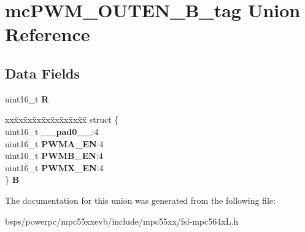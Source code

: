 \hypertarget{unionmcPWM__OUTEN__16B__tag}{}\section{mc\+P\+W\+M\+\_\+\+O\+U\+T\+E\+N\+\_\+B\+\_\+tag Union Reference}
\label{unionmcPWM__OUTEN__16B__tag}
\subsection*{Data Fields}
\begin{DoxyCompactItemize}
\item 
\mbox{\label{unionmcPWM__OUTEN__16B__tag_a33b027e5c78087d219f718cd4de486d9}} 
uint16\+\_\+t {\bfseries R}
\item 
\mbox{\label{unionmcPWM__OUTEN__16B__tag_a78e71bee511a70a963e331f0d62e7242}} 
\begin{tabbing}
xx\=xx\=xx\=xx\=xx\=xx\=xx\=xx\=xx\=\kill
struct \{\\
\>uint16\_t {\bfseries \_\_pad0\_\_}:4\\
\>uint16\_t {\bfseries PWMA\_EN}:4\\
\>uint16\_t {\bfseries PWMB\_EN}:4\\
\>uint16\_t {\bfseries PWMX\_EN}:4\\
\} {\bfseries B}\\

\end{tabbing}\end{DoxyCompactItemize}


The documentation for this union was generated from the following file\+:\begin{DoxyCompactItemize}
\item 
bsps/powerpc/mpc55xxevb/include/mpc55xx/fsl-\/mpc564x\+L.\+h\end{DoxyCompactItemize}
